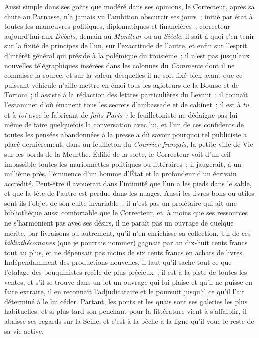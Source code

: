 \documentclass[french,twoside]{book} %
\begin{document}
Aussi simple dans ses goûts que modéré  dans ses opinions, le Correcteur, après sa chute au Parnasse, n’a jamais vu l’ambition obscurcir ses jours ; initié par état à toutes les manœuvres politiques, diplomatiques et financières ; correcteur aujourd’hui aux \emph{Débats}, demain au \emph{Moniteur} ou au \emph{Siècle}, il sait à quoi s’en tenir sur la fixité de principes de l’un, sur l’exactitude de l’autre, et enfin sur l’esprit d’intérêt général qui préside à la polémique du troisième ; il n’est pas jusqu’aux nouvelles télégraphiques insérées dans les colonnes du \emph{Commerce} dont il ne connaisse la source, et sur la valeur desquelles il ne soit fixé bien avant que ce puissant véhicule n’aille mettre en émoi tous les agioteurs de la Bourse et de Tortoni ; il assiste à la rédaction des lettres particulières du Levant ; il connaît l’estaminet d’où émanent tous les secrets d’ambassade et de cabinet ; il est à \emph{tu} et à \emph{toi} avec le fabricant de \emph{faits-Paris ;} le feuilletoniste ne  dédaigne pas lui-même de faire quelquefois la conversation avec lui, et l’un de ces confidents de toutes les pensées abandonnées à la presse a dû savoir pourquoi tel publiciste a placé dernièrement, dans un feuilleton du \emph{Courrier français}, la petite ville de Vic sur les bords de la Meurthe. Édifié de la sorte, le Correcteur voit d’un œil impassible toutes les marionnettes politiques ou littéraires ; il jaugerait, à un millième près, l’éminence d’un homme d’État et la profondeur d’un écrivain accrédité. Peut-être il avouerait dans l’intimité que l’un a les pieds dans le sable, et que la tête de l’autre est perdue dans les nuages. Aussi les livres bons ou utiles sont-ils l’objet de son culte invariable ; il n’est pas un prolétaire qui ait une bibliothèque aussi comfortable que le Correcteur, et, à moins que ses ressources ne s’harmonient pas avec ses désirs, il ne paraît pas un ouvrage de quelque mérite, par  livraisons ou autrement, qu’il n’en enrichisse sa collection. Un de ces \emph{bibliothécomanes} (que je pourrais nommer) gagnait par an dix-huit cents francs tout au plus, et ne dépensait pas moins de six cents francs en achats de livres. Indépendamment des productions nouvelles, il faut qu’il sache tout ce que l’étalage des bouquinistes recèle de plus précieux ; il est à la piste de toutes les ventes, et s’il se trouve dans un lot un ouvrage qui lui plaise et qu’il ne puisse en faire extraire, il en reconnaît l’adjudicataire et le poursuit jusqu’il ce qu’il l’ait déterminé à le lui céder. Partant, les ponts et les quais sont ses galeries les plus habituelles, et si plus tard son penchant pour la littérature vient à s’affaiblir, il abaisse ses regards sur la Seine, et c’est à la pêche à la ligne qu’il voue le reste de sa vie active.\par
\end{document}
